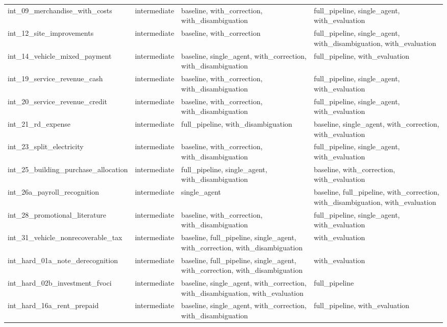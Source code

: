\begin{table}[htbp]
{\begin{tabular}{l l l l}
  int\_09\_merchandise\_with\_costs & intermediate & baseline, with\_correction, with\_disambiguation & full\_pipeline, single\_agent, with\_evaluation \\
  int\_12\_site\_improvements & intermediate & baseline, with\_correction & full\_pipeline, single\_agent, with\_disambiguation, with\_evaluation \\
  int\_14\_vehicle\_mixed\_payment & intermediate & baseline, single\_agent, with\_correction, with\_disambiguation & full\_pipeline, with\_evaluation \\
  int\_19\_service\_revenue\_cash & intermediate & baseline, with\_correction, with\_disambiguation & full\_pipeline, single\_agent, with\_evaluation \\
  int\_20\_service\_revenue\_credit & intermediate & baseline, with\_correction, with\_disambiguation & full\_pipeline, single\_agent, with\_evaluation \\
  int\_21\_rd\_expense & intermediate & full\_pipeline, with\_disambiguation & baseline, single\_agent, with\_correction, with\_evaluation \\
  int\_23\_split\_electricity & intermediate & baseline, with\_correction, with\_disambiguation & full\_pipeline, single\_agent, with\_evaluation \\
  int\_25\_building\_purchase\_allocation & intermediate & full\_pipeline, single\_agent, with\_disambiguation & baseline, with\_correction, with\_evaluation \\
  int\_26a\_payroll\_recognition & intermediate & single\_agent & baseline, full\_pipeline, with\_correction, with\_disambiguation, with\_evaluation \\
  int\_28\_promotional\_literature & intermediate & baseline, with\_correction, with\_disambiguation & full\_pipeline, single\_agent, with\_evaluation \\
  int\_31\_vehicle\_nonrecoverable\_tax & intermediate & baseline, full\_pipeline, single\_agent, with\_correction, with\_disambiguation & with\_evaluation \\
  int\_hard\_01a\_note\_derecognition & intermediate & baseline, full\_pipeline, single\_agent, with\_correction, with\_disambiguation & with\_evaluation \\
  int\_hard\_02b\_investment\_fvoci & intermediate & baseline, single\_agent, with\_correction, with\_disambiguation, with\_evaluation & full\_pipeline \\
  int\_hard\_16a\_rent\_prepaid & intermediate & baseline, single\_agent, with\_correction, with\_disambiguation & full\_pipeline, with\_evaluation \\

\end{tabular}}
\end{table}
